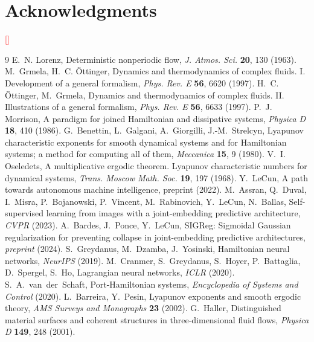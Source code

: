 \documentclass[11pt]{article}
\newcommand{\FILL}[1]{\textcolor{red}{[#1]}}
\begin{document}
\section*{Acknowledgments}
\FILL{}

\begin{thebibliography}{9}
 E.~N. Lorenz, Deterministic nonperiodic flow, \emph{J. Atmos. Sci.} \textbf{20}, 130 (1963).
 M.~Grmela, H.~C. \"Ottinger, Dynamics and thermodynamics of complex fluids. I. Development of a general formalism, \emph{Phys. Rev. E} \textbf{56}, 6620 (1997).
 H.~C. \"Ottinger, M.~Grmela, Dynamics and thermodynamics of complex fluids. II. Illustrations of a general formalism, \emph{Phys. Rev. E} \textbf{56}, 6633 (1997).
 P.~J. Morrison, A paradigm for joined Hamiltonian and dissipative systems, \emph{Physica D} \textbf{18}, 410 (1986).
 G.~Benettin, L.~Galgani, A.~Giorgilli, J.-M.~Strelcyn, Lyapunov characteristic exponents for smooth dynamical systems and for Hamiltonian systems; a method for computing all of them, \emph{Meccanica} \textbf{15}, 9 (1980).
 V.~I. Oseledets, A multiplicative ergodic theorem. Lyapunov characteristic numbers for dynamical systems, \emph{Trans. Moscow Math. Soc.} \textbf{19}, 197 (1968).
 Y.~LeCun, A path towards autonomous machine intelligence, preprint (2022).
 M.~Assran, Q.~Duval, I.~Misra, P.~Bojanowski, P.~Vincent, M.~Rabinovich, Y.~LeCun, N.~Ballas, Self-supervised learning from images with a joint-embedding predictive architecture, \emph{CVPR} (2023).
 A.~Bardes, J.~Ponce, Y.~LeCun, SIGReg: Sigmoidal Gaussian regularization for preventing collapse in joint-embedding predictive architectures, \emph{preprint} (2024).
 S.~Greydanus, M.~Dzamba, J.~Yosinski, Hamiltonian neural networks, \emph{NeurIPS} (2019).
 M.~Cranmer, S.~Greydanus, S.~Hoyer, P.~Battaglia, D.~Spergel, S.~Ho, Lagrangian neural networks, \emph{ICLR} (2020).
 S.~A.~van~der~Schaft, Port-Hamiltonian systems, \emph{Encyclopedia of Systems and Control} (2020).
 L.~Barreira, Y.~Pesin, Lyapunov exponents and smooth ergodic theory, \emph{AMS Surveys and Monographs} \textbf{23} (2002).
 G.~Haller, Distinguished material surfaces and coherent structures in three-dimensional fluid flows, \emph{Physica D} \textbf{149}, 248 (2001).

\end{thebibliography}
\end{document}
